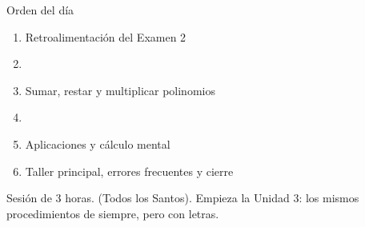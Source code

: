 \documentclass[aspectratio=169,10pt]{beamer}
\begin{document}
\portada

\begin{frame}{Orden del día}
  \begin{enumerate}
    \item Retroalimentación del Examen 2
    \item {}
    \item Sumar, restar y multiplicar polinomios
    \item {}
    \item Aplicaciones y cálculo mental
    \item Taller principal, errores frecuentes y cierre
  \end{enumerate}

  \vspace{0.25cm}
  {\footnotesize\color{uniGris} Sesión de 3 horas.
   (Todos los Santos). Empieza la Unidad 3: los
  mismos procedimientos de siempre, pero con letras. }
\end{frame}

\end{document}
